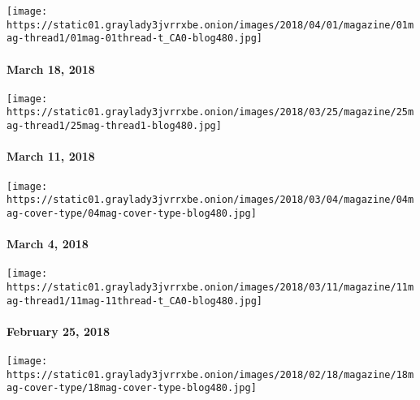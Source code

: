 \href{https://www.nytimes3xbfgragh.onion/issue/magazine/2018/03/30/31818-issue}{}

\texttt{[image: https://static01.graylady3jvrrxbe.onion/images/2018/04/01/magazine/01mag-thread1/01mag-01thread-t\_CA0-blog480.jpg]}

\hypertarget{march-18-2018}{%
\paragraph{March 18, 2018}\label{march-18-2018}}

\href{https://www.nytimes3xbfgragh.onion/interactive/2018/03/08/magazine/25-songs-future-of-music.html}{}

\texttt{[image: https://static01.graylady3jvrrxbe.onion/images/2018/03/25/magazine/25mag-thread1/25mag-thread1-blog480.jpg]}

\hypertarget{march-11-2018}{%
\paragraph{March 11, 2018}\label{march-11-2018}}

\href{https://www.nytimes3xbfgragh.onion/issue/magazine/2018/03/30/3418-issue}{}

\texttt{[image: https://static01.graylady3jvrrxbe.onion/images/2018/03/04/magazine/04mag-cover-type/04mag-cover-type-blog480.jpg]}

\hypertarget{march-4-2018}{%
\paragraph{March 4, 2018}\label{march-4-2018}}

\href{https://www.nytimes3xbfgragh.onion/issue/magazine/2018/03/30/022518}{}

\texttt{[image: https://static01.graylady3jvrrxbe.onion/images/2018/03/11/magazine/11mag-thread1/11mag-11thread-t\_CA0-blog480.jpg]}

\hypertarget{february-25-2018}{%
\paragraph{February 25, 2018}\label{february-25-2018}}

\href{https://www.nytimes3xbfgragh.onion/issue/magazine/2018/02/16/21818-issue}{}

\texttt{[image: https://static01.graylady3jvrrxbe.onion/images/2018/02/18/magazine/18mag-cover-type/18mag-cover-type-blog480.jpg]}

